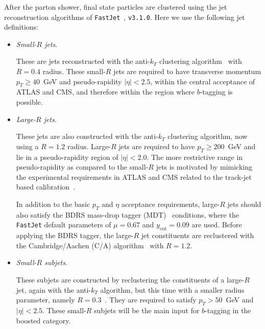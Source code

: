 After the parton shower, final state particles
are clustered using the
jet reconstruction algorithms
of
{\tt FastJet}~\cite{Cacciari:2011ma,Cacciari:2005hq},
{\tt v3.1.0}.
%
Here we use the following jet definitions:
\begin{itemize}
\item {\it Small-$R$ jets}.

  These are jets  reconstructed with the
  anti-$k_T$ clustering algorithm~\cite{Cacciari:2008gp} with $R=0.4$ radius.
  These small-$R$ jets are required
  to have transverse momentum $p_T \ge 40$~GeV
  and pseudo-rapidity $|\eta|<2.5$, within the central 
  acceptance of ATLAS and CMS, and therefore within the region
  where $b$-tagging is possible.

\item {\it Large-$R$ jets}.

  These jets are also constructed with the
  anti-$k_T$ clustering algorithm, now using a $R=1.2$ radius.
  Large-$R$ jets are required to have
  $p_T \ge 200$~GeV and lie in a pseudo-rapidity region of
  $|\eta|<2.0$.
  The more restrictive range  in pseudo-rapidity
  as compared to the small-$R$ jets
  is motivated by mimicking the  experimental requirements
  in ATLAS and CMS
  related to the track-jet based calibration~\cite{Aad:2014bia,ATLAS:2012kla}.

  In addition to the basic $p_T$ and $\eta$
  acceptance requirements, large-$R$ jets should also
  satisfy the  BDRS mass-drop tagger (MDT)~\cite{Butterworth:2008iy}
  conditions, where the {\tt FastJet} default
  parameters of  $\mu = 0.67$ and $y_{\textrm{cut}}= 0.09$ are used.
  Before applying the BDRS tagger, the large-$R$ jet
  constituents are reclustered with the Cambridge/Aachen (C/A)
  algorithm~\cite{Dokshitzer:1997in,Wobisch:1998wt}
  with $R=1.2$.

  
\item {\it Small-$R$ subjets}.

  These subjets are constructed by reclustering the constituents
  of a large-$R$ jet, again with the
  anti-$k_T$ algorithm,
  but this time with a smaller radius parameter, namely
  $R=0.3$~\cite{Aad:2015uka}. They are required to satisfy $p_T > 50$~GeV and $|\eta|<2.5$.
  These small-$R$ subjets will be the main input for
  $b$-tagging in the boosted category.
\end{itemize}

